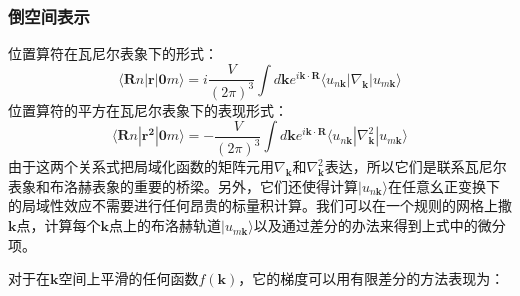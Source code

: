 \subsubsection{倒空间表示}
位置算符在瓦尼尔表象下的形式：
\begin{equation}
\langle \bm{R}n |\bm{r}|\bm{0}m\rangle=i \frac{V}{(2\pi)^3}\int d\bm{k} e^{i \bm{k} \cdot \bm{R}} \langle u_{n \bm{k}}| \nabla_{\bm{k}}| u_{m \bm{k}}\rangle
\end{equation}
位置算符的平方在瓦尼尔表象下的表现形式：
\begin{equation}
\langle \bm{R}n |\bm{r^2}|\bm{0}m\rangle=- \frac{V}{(2\pi)^3}\int d\bm{k} e^{i \bm{k} \cdot \bm{R}} \langle u_{n \bm{k}}| \nabla^2_{\bm{k}}| u_{m \bm{k}}\rangle
\end{equation}
由于这两个关系式把局域化函数的矩阵元用$\nabla_{\bm{k}}$和$ \nabla^2_{\bm{k}}$表达，所以它们是联系瓦尼尔表象和布洛赫表象的重要的桥梁。另外，它们还使得计算$|u_{n\bm{k}}\rangle$在任意幺正变换下的局域性效应不需要进行任何昂贵的标量积计算。我们可以在一个规则的网格上撒$\bm{k}$点，计算每个$\bm{k}$点上的布洛赫轨道$|u_{m\bm{k}}\rangle$以及通过差分的办法来得到上式中的微分项。

对于在$\bm{k}$空间上平滑的任何函数$f(\bm{k})$，它的梯度可以用有限差分的方法表现为：

